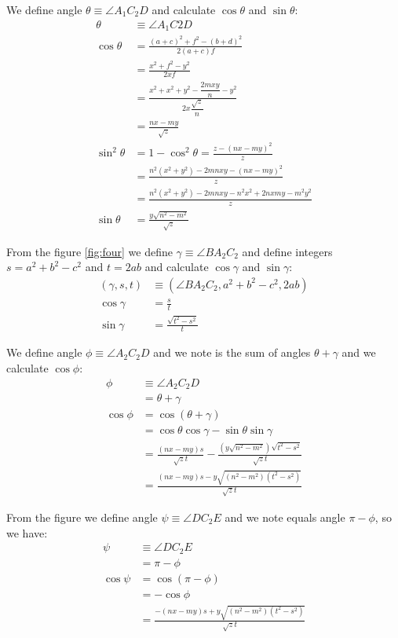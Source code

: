 \documentclass[11pt]{article}
\begin{document}
We define angle $\theta \equiv \angle{A_1C_2D}$ and calculate $\cos\theta$ and $\sin\theta$:
\begin{align}
\theta &\equiv \angle{A_1C2D}\\
\cos\theta &= \frac{(a+c)^2 + f^2 - (b+d)^2}{2(a+c)f}\nonumber\\
 &= \frac{x^2 + f^2 - y^2}{2xf}\nonumber\\
 &= \frac{x^2 + x^2 + y^2 - \dfrac{2mxy}{n} - y^2}{2x\dfrac{\sqrt{z}}{n}}\nonumber\\
 &= \frac{nx - my}{\sqrt{z}}\\
\sin^2\theta &= 1 - \cos^2\theta = \frac{z - (nx - my)^2}z\nonumber\\
 &= \frac{n^2(x^2 + y^2) - 2mnxy - (nx-my)^2}z\nonumber\\
 &= \frac{n^2(x^2 + y^2) - 2mnxy - n^2x^2 +2nxmy - m^2y^2}z\nonumber\\
\sin\theta &= \frac{y\sqrt{n^2 - m^2}}{\sqrt{z}}
\end{align}

From the figure \ref{fig:four} we define $\gamma \equiv \angle{BA_2C_2}$ and define integers $s=a^2 + b^2 - c^2$ and $t=2ab$ and calculate $\cos\gamma$ and $\sin\gamma$:
\begin{align}
(\gamma,s,t) &\equiv (\angle{BA_2C_2}, a^2 + b^2 - c^2, 2ab) \label{eq:st}\\
\cos\gamma &= \frac{s}{t}\\
\sin\gamma &= \frac{\sqrt{t^2-s^2}}{t}
\end{align}

We define angle $\phi \equiv \angle{A_2C_2D}$ and we note is the sum of angles $\theta + \gamma$ and we calculate $\cos\phi$:
\begin{align}
\phi &\equiv \angle{A_2C_2D}\\
 &= \theta + \gamma\\
\cos\phi &= \cos(\theta + \gamma)\\
 &= \cos\theta\cos\gamma - \sin\theta\sin\gamma\nonumber\\
 &= \frac{(nx - my)s}{\sqrt{z}t} - \frac{(y\sqrt{n^2 - m^2})\sqrt{t^2-s^2}}{\sqrt{z}t}\nonumber\\
 &= \frac{(nx - my)s - y\sqrt{(n^2 - m^2)(t^2-s^2)}}{\sqrt{z}t}
\end{align}

From the figure we define angle $\psi \equiv \angle{DC_2E}$ and we note equals angle $\pi - \phi$, so we have:
\begin{align}
\psi &\equiv \angle{DC_2E}\\
 &= \pi - \phi\\
\cos\psi &= \cos(\pi - \phi)\\
 &= -\cos\phi\nonumber\\
 &= \frac{-(nx - my)s + y\sqrt{(n^2 - m^2)(t^2-s^2)}}{\sqrt{z}t}
\end{align}
\end{document}
